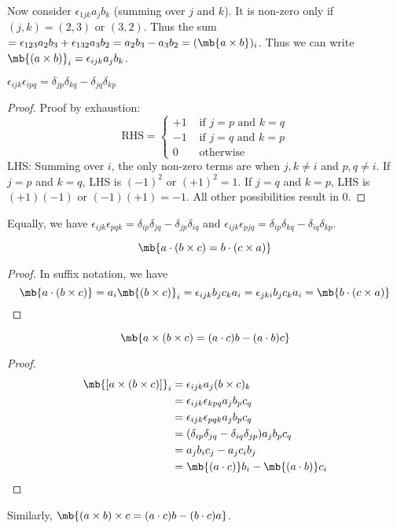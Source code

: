 \documentclass[a4paper]{article}
\begin{document}
Now consider $\epsilon_{1jk}a_jb_k$ (summing over $j$ and $k$). It is non-zero only if $(j, k) = (2, 3)$ or $(3, 2)$. Thus the sum $= \epsilon_{123}a_2b_3 + \epsilon_{132}a_3b_2 = a_2b_3 - a_3b_2 = (\mb{a\times b})_i$. Thus we can write
$\mb{(a \times b)}_i = \epsilon_{ijk}a_jb_k$.
\begin{thm}
  $\epsilon_{ijk}\epsilon_{ipq} = \delta_{jp}\delta_{kq} - \delta_{jq}\delta_{kp}$
\end{thm}

\begin{proof}
Proof by exhaustion:
\[
\text{RHS} = \begin{cases}
  +1 &\text{ if } j = p \text{ and } k = q\\
  -1 &\text{ if } j = q \text{ and } k = p\\
  0 &\text{ otherwise}
\end{cases}
\]
LHS: Summing over $i$, the only non-zero terms are when $j, k\not=i$ and $p, q\not=i$. If $j = p$ and $k = q$, LHS is $(-1)^2$ or $(+1)^2 = 1$. If $j = q$ and $k = p$, LHS is $(+1)(-1)$ or $(-1)(+1) = -1$. All other possibilities result in 0.
\end{proof}
Equally, we have $\epsilon_{ijk}\epsilon_{pqk} = \delta_{ip}\delta_{jq} - \delta_{jp}\delta_{iq}$ and $\epsilon_{ijk}\epsilon_{pjq} = \delta_{ip}\delta_{kq} - \delta_{iq}\delta_{kp}$.

\begin{prop}
  \[
  \mb{a\cdot (b\times c) = b\cdot(c\times a)}
  \]
\end{prop}
\begin{proof}
  In suffix notation, we have
  \[
  \mb{a\cdot (b\times c)} = a_i\mb{(b\times c)}_i = \epsilon_{ijk}b_jc_ka_i = \epsilon_{jki}b_jc_ka_i = \mb{b\cdot (c\times a)}
  \]
\end{proof}

\begin{thm}
  \[
  \mb{a\times (b\times c) = (a\cdot c)b - (a\cdot b)c}
  \]
\end{thm}
\begin{proof}
  \begin{align*}
    \mb{[a\times(b\times c)]}_i &= \epsilon_{ijk} a_j(b\times c)_k \\
    &= \epsilon_{ijk}\epsilon_{kpq}a_jb_pc_q\\
    &= \epsilon_{ijk}\epsilon_{pqk} a_jb_pc_q\\
    &= (\delta_{ip}\delta_{jq}-\delta_{iq}\delta_{jp})a_jb_pc_q\\
    &= a_jb_ic_j - a_jc_ib_j\\
    &= \mb{(a\cdot c)}b_i - \mb{(a\cdot b)}c_i
  \end{align*}
\end{proof}
Similarly, $\mb{(a\times b)\times c = (a\cdot c)b - (b\cdot c)a}$.
\end{document}
